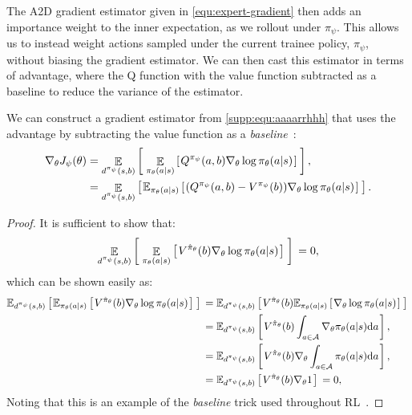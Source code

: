 The A2D gradient estimator given in \eqref{equ:expert-gradient} then adds an importance weight to the inner expectation, as we rollout under $\pi_{\psi}$.  This allows us to instead weight actions sampled under the current trainee policy, $\pi_{\psi}$, without biasing the gradient estimator.  We can then cast this estimator in terms of advantage, where the Q function with the value function subtracted as a baseline to reduce the variance of the estimator.


\begin{lemma} 
We can construct a gradient estimator from \eqref{supp:equ:aaaarrhhh} that uses the advantage by subtracting the value function as a \emph{baseline}~\cite{bertsekas2019reinforcement, sutton1992reinforcement,williams1992simple}:
\begin{align}
    \nabla_{\theta} J_{\psi}(\theta) &= \mathop{\mathbb{E}}_{d^{\pi_{\psi}}(s, b)} \left[ \hspace*{0.1em}{}  \mathop{\mathbb{E}}_{\pi_{\theta}(a | s)} \left[ \hspace*{0.1em}{}  Q^{\pi_{\psi}}(a,b)  \nabla_{\theta} \log \pi_{\theta}(a|s) \hspace*{0.1em} \right]{}  \hspace*{0.1em} \right]{}, \\
    &= \mathop{\mathbb{E}}_{d^{\pi_{\psi}}(s, b)} \left[ \hspace*{0.1em}{}  \mathbb{E}_{\pi_{\theta}(a | s)} \left[ \hspace*{0.1em}{}  (Q^{\pi_{\psi}}(a,b)-V^{\pi_{\psi}}(b))  \nabla_{\theta} \log \pi_{\theta}(a|s) \hspace*{0.1em} \right]{}  \hspace*{0.1em} \right]{} .
\end{align}
\end{lemma}
\begin{proof}
It is sufficient to show that:
\begin{equation}
    \mathop{\mathbb{E}}_{d^{\pi_{\psi}}(s, b)} \left[ \hspace*{0.1em}{}  \mathop{\mathbb{E}}_{\pi_{\theta}(a | s)} \left[ \hspace*{0.1em}{}  V^{\hat{\pi}_{\theta}}(b) \nabla_{\theta} \log \pi_{\theta}(a|s) \hspace*{0.1em} \right]{}  \hspace*{0.1em} \right]{}  = 0,
\end{equation}
which can be shown easily as:
\begin{align}
    \mathbb{E}_{d^{\pi_{\psi}}(s, b)} \left[ \hspace*{0.1em}{}  \mathbb{E}_{\pi_{\theta}(a | s)} \left[ \hspace*{0.1em}{}  V^{\hat{\pi}_{\theta}}(b) \nabla_{\theta} \log \pi_{\theta}(a|s) \hspace*{0.1em} \right]{}  \hspace*{0.1em} \right]{} &= \mathbb{E}_{d^{\pi_{\psi}}(s, b)} \left[ \hspace*{0.1em}{}  V^{\hat{\pi}_{\theta}}(b) \mathbb{E}_{\pi_{\theta}(a | s)} \left[ \hspace*{0.1em}{}   \nabla_{\theta} \log \pi_{\theta}(a|s) \hspace*{0.1em} \right]{}  \hspace*{0.1em} \right]{}  \\
    &= \mathbb{E}_{d^{\pi_{\psi}}(s, b)} \left[ \hspace*{0.1em}{}  V^{\hat{\pi}_{\theta}}(b) \int_{a \in \mathcal{A}} \nabla_{\theta} \pi_{\theta}(a|s) \mathrm{d} a \hspace*{0.1em} \right]{} ,\\
    &= \mathbb{E}_{d^{\pi_{\psi}}(s, b)} \left[ \hspace*{0.1em}{}  V^{\hat{\pi}_{\theta}}(b) \nabla_{\theta} \int_{a \in \mathcal{A}} \pi_{\theta}(a|s) \mathrm{d} a \hspace*{0.1em} \right]{},  \\
    &= \mathbb{E}_{d^{\pi_{\psi}}(s, b)} \left[ \hspace*{0.1em}{}  V^{\hat{\pi}_{\theta}}(b) \nabla_{\theta} 1 \hspace*{0.1em} \right]{}  = 0,
\end{align}
Noting that this is an example of the \emph{baseline} trick used throughout RL~\cite{bertsekas2019reinforcement, sutton1992reinforcement, williams1992simple}.
\end{proof}
